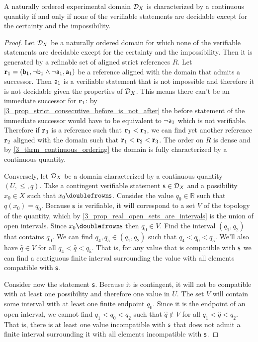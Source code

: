 \documentclass[11pt,letterpaper,fleqn]{memoir} %
\begin{document}
\begin{mathSection}
\begin{prop}
	A naturally ordered experimental domain $\edomain_X$ is characterized by a continuous quantity if and only if none of the verifiable statements are decidable except for the certainty and the impossibility.
\end{prop}
\begin{proof}
	Let $\edomain_X$ be a naturally ordered domain for which none of the verifiable statements are decidable except for the certainty and the impossibility. Then it is generated by a refinable set of aligned strict references $R$. Let $\refStmt_1=(\stmt[b]_1, \NOT \stmt[b]_1 \AND \NOT \stmt[a]_1, \stmt[a]_1)$ be a reference aligned with the domain that admits a successor. Then $\stmt[a]_1$ is a verifiable statement that is not impossible and therefore it is not decidable given the properties of $\edomain_X$. This means there can't be an immediate successor for $\refStmt_1$: by \ref{3_prop_strict_consecutive_before_is_not_after} the before statement of the immediate successor would have to be equivalent to $\NOT\stmt[a]_1$ which is not verifiable. Therefore if $\refStmt_3$ is a reference such that $\refStmt_1 < \refStmt_3$, we can find yet another reference $\refStmt_2$ aligned with the domain such that $\refStmt_1 < \refStmt_2 < \refStmt_3$. The order on $R$ is dense and by \ref{3_thrm_continuous_ordering} the domain is fully characterized by a continuous quantity.
	
	Conversely, let $\edomain_X$ be a domain characterized by a continuous quantity $(U, \leq, q)$. Take a contingent verifiable statement $\stmt \in \edomain_X$ and a possibility $x_0 \in X$ such that $x_0 \comp \stmt$. Consider the value $q_0 \in \mathbb{R}$ such that $q(x_0) = q_0$. Because $\stmt$ is verifiable, it will correspond to a set $V$ of the topology of the quantity, which by \ref{3_prop_real_open_sets_are_intervals} is the union of open intervals. Since $x_0 \comp \stmt$ then $q_0 \in V$. Find the interval $(q_1, q_2)$ that contains $q_0$. We can find $q_4, q_5 \in (q_1, q_2)$ such that $q_4 < q_0 < q_5$. We'll also have $\hat{q} \in V$ for all $q_4 < \hat{q} < q_5$. That is, for any value that is compatible with $\stmt$ we can find a contiguous finite interval surrounding the value with all elements compatible with $\stmt$.
	
	Consider now the statement $\stmt$. Because it is contingent, it will not be compatible with at least one possibility and therefore one value in $U$. The set $V$ will contain some interval with at least one finite endpoint $q_0$. Since it is the endpoint of an open interval, we cannot find $q_1 < q_0 < q_2$ such that $\hat{q} \notin V$ for all $q_1 < \hat{q} < q_2$. That is, there is at least one value incompatible with $\stmt$ that does not admit a finite interval surrounding it with all elements incompatible with $\stmt$.
	

\end{proof}
\end{mathSection}
\end{document}
